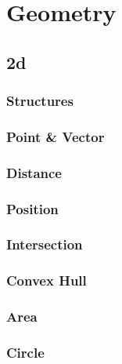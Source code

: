 \section{Geometry}

\subsection{2d}
\subsubsection{Structures}


\subsubsection{Point \& Vector}


\subsubsection{Distance}


\subsubsection{Position}


\subsubsection{Intersection}


\subsubsection{Convex Hull}


\subsubsection{Area}


\subsubsection{Circle}


